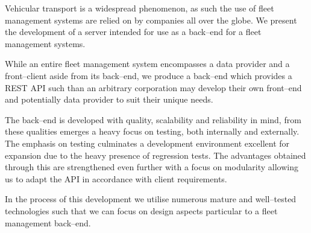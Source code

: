 Vehicular transport is a widespread phenomenon, as such the use of fleet management systems are relied on by companies all over the globe.
We present the development of a server intended for use as a back--end for a fleet management systems.

\bigskip \noindent
While an entire fleet management system encompasses a data provider and a front--client aside from its back--end, we produce a back--end which provides a REST API such than an arbitrary corporation may develop their own front--end and potentially data provider to suit their unique needs.

\bigskip \noindent
The back--end is developed with quality, scalability and reliability in mind, from these qualities emerges a heavy focus on testing, both internally and externally.
The emphasis on testing culminates a development environment excellent for expansion due to the heavy presence of regression tests.
The advantages obtained through this are strengthened even further with a focus on modularity allowing us to adapt the API in accordance with client requirements.

\bigskip \noindent
In the process of this development we utilise numerous mature and well--tested technologies such that we can focus on design aspects particular to a fleet management back--end.

